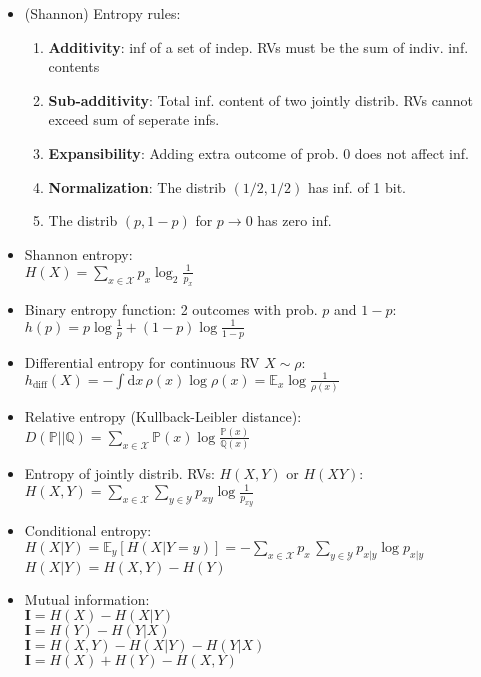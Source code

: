 \documentclass[twocolumn,10pt]{article}
\begin{document}
\begin{itemize}
	\item (Shannon) Entropy rules:
		\begin{enumerate}
			\item \textbf{Additivity}: inf of a set of indep. RVs must be the sum of indiv. inf. contents 
			\item \textbf{Sub-additivity}: Total inf. content of two jointly distrib. RVs cannot exceed sum of seperate infs.
			\item \textbf{Expansibility}: Adding extra outcome of prob. 0 does not affect inf.
			\item \textbf{Normalization}: The distrib $(1/2,1/2)$ has inf. of 1 bit.
			\item The distrib $(p, 1-p)$ for $p \to 0$ has zero inf.
		\end{enumerate}

	\item Shannon entropy:\\
	$H(X) = \sum_{x \in \mathcal{X}} p_x \log_2 \frac{1}{p_x}$

	\item Binary entropy function: 2 outcomes with prob. $p$ and $1-p$: \\
	$h(p) = p \log \frac{1}{p} + (1 - p) \log \frac{1}{1-p}$

	\item Differential entropy for continuous RV $X \sim \rho$:\\
	$h_{\text{diff}}(X) = - \int \mathrm{d}x\, \rho(x) \log \rho(x) = \mathbb{E}_x \log \frac{1}{\rho(x)}$

	\item Relative entropy (Kullback-Leibler distance): \\
	$D(\mathbb{P}||\mathbb{Q}) = \sum_{x \in \mathcal{X}} \mathbb{P}(x) \log \frac{\mathbb{P}(x)}{\mathbb{Q}(x)}$

	\item Entropy of jointly distrib. RVs: $H(X,Y)$ or $H(XY)$: \\
	$H(X,Y) = \sum_{x \in \mathcal{X}} \sum_{y \in \mathcal{Y}} p_{xy} \log \frac{1}{p_{xy}}$

	\item Conditional entropy: \\
	$H(X|Y) = \mathbb{E}_y[H(X|Y = y)] = - \sum_{x \in \mathcal{X}} p_x\, \sum_{y \in \mathcal{Y}} p_{x|y} \log p_{x|y}$ \\
	$H(X|Y) = H(X,Y) - H(Y)$
	
	\item Mutual information: \\
	$\mathbf{I} = H(X) - H(X|Y)$\\
	$\mathbf{I} = H(Y) - H(Y|X)$\\
	$\mathbf{I} = H(X,Y) - H(X|Y) - H(Y|X)$\\
	$\mathbf{I} = H(X) + H(Y) - H(X,Y)$\\



\end{itemize}
\end{document}
